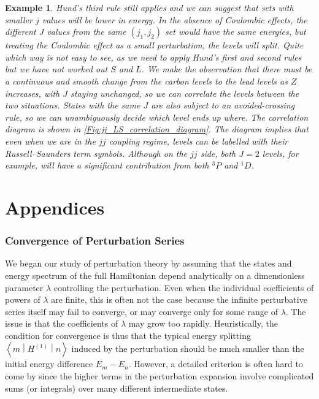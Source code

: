 \documentclass{article}
\theoremstyle{plain}\theoremheaderfont{\normalfont\itshape}\theorembodyfont{\rmfamily}\theoremseparator{.}\newtheorem*{rem}{Remark}\newtheorem*{ex}{Example}\newtheorem*{proof}{Proof}\newtheorem*{altp}{Alternative proof}
\theoremstyle{plain}\theoremheaderfont{\normalfont\bfseries}\theorembodyfont{\rmfamily}\theoremseparator{.}\newtheorem{thm}{Theorem}[section]\newtheorem{lem}[thm]{Lemma}\newtheorem{prop}[thm]{Proposition}\newtheorem*{cor}{Corollary}\newtheorem{defn}[thm]{Definition}\newtheorem{clm}[thm]{Claim}\newtheorem{clminproof}{Claim}
\theoremstyle{break}\theoremheaderfont{\normalfont\itshape}\theorembodyfont{\rmfamily}\theoremseparator{.\medskip}\newtheorem*{proofskip}{Proof}\newtheorem*{exs}{Examples}\newtheorem*{rems}{Remarks}
\theoremstyle{break}\theoremheaderfont{\normalfont\bfseries}\theorembodyfont{\rmfamily}\theoremseparator{.\medskip}\newtheorem{lemskip}[thm]{Lemma}\newtheorem{defnskip}[thm]{Definition}\newtheorem{propskip}[thm]{Proposition}\newtheorem{thmskip}[thm]{Theorem}
\numberwithin{equation}{section}
\newcommand{\mel}[3]{\left\langle #1 \middle| #2 \middle| #3 \right\rangle}
\begin{document}
\begin{ex}
        Hund's third rule still applies and we can suggest that sets with smaller \(j\) values will be lower in energy. In the absence of Coulombic effects, the different \(J\) values from the same \((j_1,j_2)\) set would have the same energies, but treating the Coulombic effect as a small perturbation, the levels will split. Quite which way is not easy to see, as we need to apply Hund's first and second rules but we have not worked out \(S\) and \(L\). We make the observation that there must be a continuous and smooth change from the carbon levels to the lead levels as \(Z\) increases, with \(J\) staying unchanged, so we can correlate the levels between the two situations. States with the same \(J\) are also subject to an avoided-crossing rule, so we can unambiguously decide which level ends up where. The correlation diagram is shown in \cref{Fig:jj_LS_correlation_diagram}. The diagram implies that even when we are in the \(jj\) coupling regime, levels can be labelled with their Russell--Saunders term symbols. Although on the \(jj\) side, both \(J=2\) levels, for example, will have a significant contribution from both \(^3P\) and \(^1D\).
    \end{ex}

    \newpage
    \part*{Appendices}
    \appendix

    \section{Convergence of Perturbation Series}\label{Appendix:Converge}
    We began our study of perturbation theory by assuming that the states and energy spectrum of the full Hamiltonian depend analytically on a dimensionless parameter \(\lambda\) controlling the perturbation. Even when the individual coefficients of powers of \(\lambda\) are finite, this is often not the case because the infinite perturbative series itself may fail to converge, or may converge only for some range of \(\lambda\). The issue is that the coefficients of \(\lambda\) may grow too rapidly. Heuristically, the condition for convergence is thus that the typical energy splitting \(\mel{m}{H^{(1)}}{n}\) induced by the perturbation should be much smaller than the initial energy difference \(E_m-E_n\). However, a detailed criterion is often hard to come by since the higher terms in the perturbation expansion involve complicated sums (or integrals) over many different intermediate states.
\end{document}
